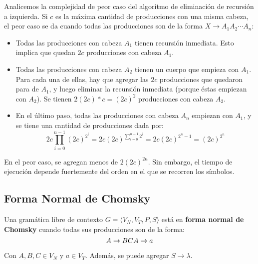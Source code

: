 Analicemos la complejidad de peor caso del algoritmo de eliminación de recursión a izquierda. Si $c$ es la máxima cantidad de producciones con una misma cabeza, el peor caso se da cuando todas las producciones son de la forma $X \to A_1 A_2 \cdots A_n$:
\begin{itemize}
    \item Todas las producciones con cabeza $A_1$ tienen recursión inmediata. Esto implica que quedan $2c$ producciones con cabeza $A_1$.
    \item Todas las producciones con cabeza $A_2$ tienen un cuerpo que empieza con $A_1$. Para cada una de ellas, hay que agregar las $2c$ producciones que quedaron para de $A_1$, y luego eliminar la recursión inmediata (porque éstas empiezan con $A_2$). Se tienen $2(2c) * c = (2c)^2$ producciones con cabeza $A_2$.
    \item En el último paso, todas las producciones con cabeza $A_n$ empiezan con $A_1$, y se tiene una cantidad de producciones dada por:
    $$
        2c \prod_{i = 0}^{n - 1} (2c)^{2^i} = 2c (2c)^{\sum_{i = 0}^{n - 1} 2^i} = 2c (2c)^{2^n - 1} = (2c)^{2^n}
    $$
\end{itemize}

En el peor caso, se agregan menos de $2(2c)^{2n}$. Sin embargo, el tiempo de ejecución depende fuertemente del orden en el que se recorren los símbolos.

\subsection{Forma Normal de Chomsky}

Una gramática libre de contexto $G = \langle V_N, V_T, P, S \rangle$ está en \textbf{forma normal de Chomsky} cuando todas sus producciones son de la forma:
$$
    A \to BC \\
    A \to a
$$

Con $A, B, C \in V_N$ y $a \in V_T$. Además, se puede agregar $S \to \lambda$.

